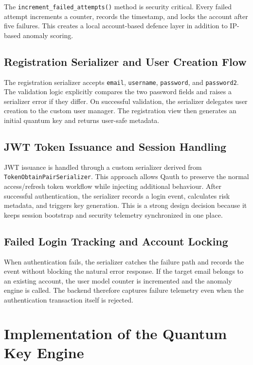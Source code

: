 \documentclass[12pt,a4paper]{report}
\begin{document}
The \texttt{increment\_failed\_attempts()} method is security critical. Every failed attempt increments a counter, records the timestamp, and locks the account after five failures. This creates a local account-based defence layer in addition to IP-based anomaly scoring.

\subsection{Registration Serializer and User Creation Flow}
The registration serializer accepts \texttt{email}, \texttt{username}, \texttt{password}, and \texttt{password2}. The validation logic explicitly compares the two password fields and raises a serializer error if they differ. On successful validation, the serializer delegates user creation to the custom user manager. The registration view then generates an initial quantum key and returns user-safe metadata.

\subsection{JWT Token Issuance and Session Handling}
JWT issuance is handled through a custom serializer derived from \texttt{TokenObtainPairSerializer}. This approach allows Qauth to preserve the normal access/refresh token workflow while injecting additional behaviour. After successful authentication, the serializer records a login event, calculates risk metadata, and triggers key generation. This is a strong design decision because it keeps session bootstrap and security telemetry synchronized in one place.

\subsection{Failed Login Tracking and Account Locking}
When authentication fails, the serializer catches the failure path and records the event without blocking the natural error response. If the target email belongs to an existing account, the user model counter is incremented and the anomaly engine is called. The backend therefore captures failure telemetry even when the authentication transaction itself is rejected.

\section{Implementation of the Quantum Key Engine}
\end{document}
